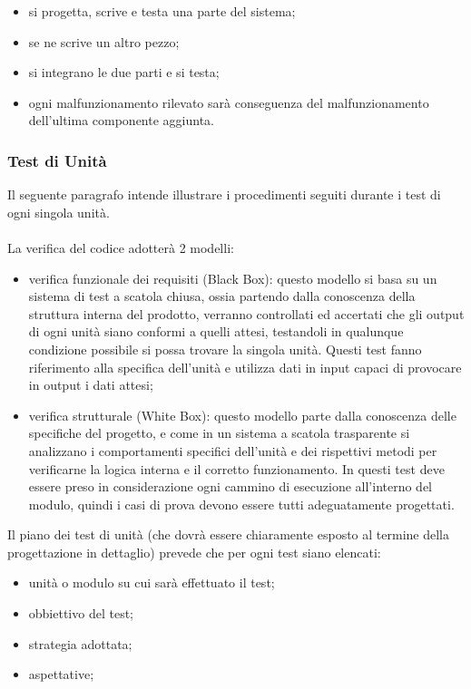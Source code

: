 \begin{itemize}
  \item si progetta, scrive e testa una parte del sistema;
  \item se ne scrive un altro pezzo;
  \item si integrano le due parti e si testa;
  \item ogni malfunzionamento rilevato sar\`a conseguenza del malfunzionamento
  dell'ultima componente aggiunta.
\end{itemize}


\subsubsection*{Test di Unit\`a}
Il seguente paragrafo intende illustrare i procedimenti seguiti durante i test
di ogni singola unit\`a.\\ \\
La verifica del codice adotter\`a 2 modelli:

\begin{itemize}
  \item verifica funzionale dei requisiti (Black Box): questo modello si basa su
  un sistema di test a scatola chiusa, ossia partendo dalla conoscenza della struttura interna del 
prodotto, verranno controllati ed accertati che gli output di ogni unit\`a siano  conformi 
a quelli attesi, testandoli in qualunque condizione possibile si possa trovare la singola 
unit\`a. Questi test fanno riferimento alla specifica dell'unit\`a e utilizza
dati in input capaci di provocare in output i dati attesi;
  \item verifica strutturale (White Box): questo modello parte dalla conoscenza 
  delle specifiche del progetto, e come in un sistema a scatola trasparente si analizzano i 
comportamenti specifici dell'unit\`a e dei rispettivi metodi per verificarne la logica 
interna e il corretto funzionamento. In questi test deve essere preso in considerazione 
ogni cammino di esecuzione all'interno del modulo, quindi i casi di prova devono essere 
tutti adeguatamente progettati. 
\end{itemize}


Il piano dei test di unit\`a (che dovr\`a essere chiaramente esposto al termine
della progettazione in dettaglio) prevede che per ogni test siano elencati:

\begin{itemize}
  \item unit\`a o modulo su cui sar\`a effettuato il test;
  \item obbiettivo del test;
  \item strategia adottata;
  \item aspettative;
\end{itemize}

